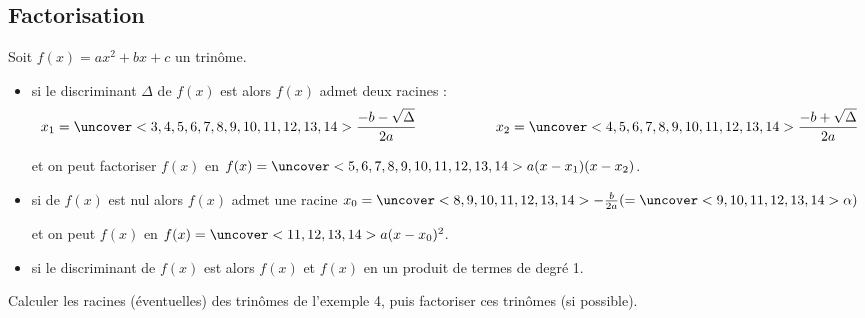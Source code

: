 \documentclass{beamer}
\begin{document}
\subsection{Factorisation}

  \begin{frame}
    \begin{theorem}[Central]
    Soit $f(x)=ax^2+bx+c$ un trinôme.
    \begin{itemize}
      \item  si le discriminant $\Delta$ de $f(x)$ est 
       alors $f(x)$ admet deux racines :
      $$x_1=\uncover<3,4,5,6,7,8,9,10,11,12,13,14>{\frac{-b-\sqrt{\Delta}}{2a}} 
      \hspace{2cm} x_2=
      \uncover<4,5,6,7,8,9,10,11,12,13,14>{\frac{-b+\sqrt{\Delta}}{2a}}$$
     
      et on peut factoriser $f(x)$ en $f(x)=
      \uncover<5,6,7,8,9,10,11,12,13,14>{a(x-x_1)(x-x_2)}$.
     
      \item si  de $f(x)$ est nul alors $f(x)$ admet une racine 
     $x_0=\uncover<8,9,10,11,12,13,14>{-\frac{b}{2a}}(=\uncover<9,10,11,12,13,14>{\alpha})$
     
     et on peut  $f(x)$ en $f(x)=
     \uncover<11,12,13,14>{a(x-x_0)^2}$.
     \item si le discriminant de $f(x)$ est  
     alors $f(x)$  et 
      $f(x)$ en un produit de termes de degré 1.
    \end{itemize}    
  \end{theorem}
  \end{frame}


\begin{frame}
  \begin{example}
    Calculer les racines (éventuelles) des trinômes de l'exemple 4, puis factoriser
    ces trinômes (si possible).
   \end{example}
\end{frame}
\end{document}

